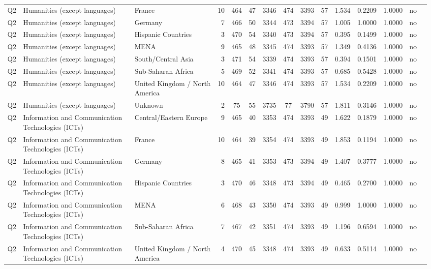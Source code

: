 \begin{longtable}{lllrcccccccccll}
Q2 & Humanities (except languages) & France & 10 & 464 & 47 & 3346 & 474 & 3393 & 57 & 1.534 & 0.2209 & 1.0000 & no \\
Q2 & Humanities (except languages) & Germany & 7 & 466 & 50 & 3344 & 473 & 3394 & 57 & 1.005 & 1.0000 & 1.0000 & no \\
Q2 & Humanities (except languages) & Hispanic Countries & 3 & 470 & 54 & 3340 & 473 & 3394 & 57 & 0.395 & 0.1499 & 1.0000 & no \\
Q2 & Humanities (except languages) & MENA & 9 & 465 & 48 & 3345 & 474 & 3393 & 57 & 1.349 & 0.4136 & 1.0000 & no \\
Q2 & Humanities (except languages) & South/Central Asia & 3 & 471 & 54 & 3339 & 474 & 3393 & 57 & 0.394 & 0.1501 & 1.0000 & no \\
Q2 & Humanities (except languages) & Sub-Saharan Africa & 5 & 469 & 52 & 3341 & 474 & 3393 & 57 & 0.685 & 0.5428 & 1.0000 & no \\
Q2 & Humanities (except languages) & United Kingdom / North America & 10 & 464 & 47 & 3346 & 474 & 3393 & 57 & 1.534 & 0.2209 & 1.0000 & no \\
Q2 & Humanities (except languages) & Unknown & 2 & 75 & 55 & 3735 & 77 & 3790 & 57 & 1.811 & 0.3146 & 1.0000 & no \\
Q2 & Information and Communication Technologies (ICTs) & Central/Eastern Europe & 9 & 465 & 40 & 3353 & 474 & 3393 & 49 & 1.622 & 0.1879 & 1.0000 & no \\
Q2 & Information and Communication Technologies (ICTs) & France & 10 & 464 & 39 & 3354 & 474 & 3393 & 49 & 1.853 & 0.1194 & 1.0000 & no \\
Q2 & Information and Communication Technologies (ICTs) & Germany & 8 & 465 & 41 & 3353 & 473 & 3394 & 49 & 1.407 & 0.3777 & 1.0000 & no \\
Q2 & Information and Communication Technologies (ICTs) & Hispanic Countries & 3 & 470 & 46 & 3348 & 473 & 3394 & 49 & 0.465 & 0.2700 & 1.0000 & no \\
Q2 & Information and Communication Technologies (ICTs) & MENA & 6 & 468 & 43 & 3350 & 474 & 3393 & 49 & 0.999 & 1.0000 & 1.0000 & no \\
Q2 & Information and Communication Technologies (ICTs) & Sub-Saharan Africa & 7 & 467 & 42 & 3351 & 474 & 3393 & 49 & 1.196 & 0.6594 & 1.0000 & no \\
Q2 & Information and Communication Technologies (ICTs) & United Kingdom / North America & 4 & 470 & 45 & 3348 & 474 & 3393 & 49 & 0.633 & 0.5114 & 1.0000 & no \\

\end{longtable}
